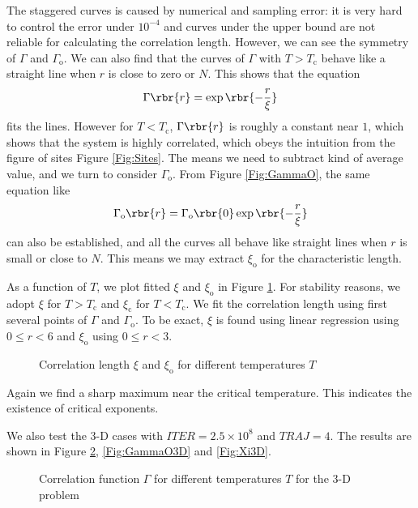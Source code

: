 \documentclass[english, nochinese]{pnote}
\begin{document}
The staggered curves is caused by numerical and sampling error: it is very hard to control the error under $10^{-4}$ and curves under the upper bound are not reliable for calculating the correlation length. However, we can see the symmetry of $\Gamma$ and $\Gamma_{\text{o}}$. We can also find that the curves of $\Gamma$ with $ T > T_{\text{c}} $ behave like a straight line when $r$ is close to zero or $N$. This shows that the equation
\begin{equation}
\Gamma \rbr{r} = \exp \rbr{-\frac{r}{\xi}}
\end{equation}
fits the lines. However for $ T < T_{\text{c}} $, $ \Gamma \rbr{r} $ is roughly a constant near $1$, which shows that the system is highly correlated, which obeys the intuition from the figure of sites Figure \ref{Fig:Sites}. The means we need to subtract kind of average value, and we turn to consider $\Gamma_{\text{o}}$. From Figure \ref{Fig:GammaO}, the same equation like
\begin{equation}
\Gamma_{\text{o}} \rbr{r} = \Gamma_{\text{o}} \rbr{0} \exp \rbr{-\frac{r}{\xi}}
\end{equation}
can also be established, and all the curves all behave like straight lines when $r$ is small or close to $N$. This means we may extract $\xi_{\text{o}}$ for the characteristic length.

As a function of $T$, we plot fitted $\xi$ and $\xi_{\text{o}}$ in Figure \ref{Fig:Xi}. For stability reasons, we adopt $\xi$ for $ T > T_{\text{c}} $ and $\xi_{\text{c}}$ for $ T < T_{\text{c}} $. We fit the correlation length using first several points of $\Gamma$ and $\Gamma_{\text{o}}$. To be exact, $\xi$ is found using linear regression using $ 0 \le r < 6 $ and $\xi_{\text{o}}$ using $ 0 \le r < 3 $.

\begin{figure}[htbp]
\centering

\caption{Correlation length $\xi$ and $\xi_{\text{o}}$ for different temperatures $T$}
\label{Fig:Xi}
\end{figure}

Again we find a sharp maximum near the critical temperature. This indicates the existence of critical exponents.

We also test the 3-D cases with $ \mathit{ITER} = 2.5 \times 10^8 $ and $ \mathit{TRAJ} = 4 $. The results are shown in Figure \ref{Fig:Gamma3D}, \ref{Fig:GammaO3D} and \ref{Fig:Xi3D}.

\begin{figure}[htbp]
\centering

\caption{Correlation function $\Gamma$ for different temperatures $T$ for the 3-D problem}
\label{Fig:Gamma3D}
\end{figure}
\end{document}

